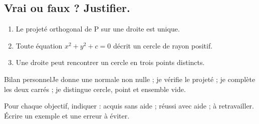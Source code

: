 \subsection*{Vrai ou faux ? Justifier.}\label{C07-VF}
\begin{enumerate}
\item Le projeté orthogonal de P sur une droite est unique.
\item Toute équation $x^2+y^2+c=0$ décrit un cercle de rayon positif.
\item Une droite peut rencontrer un cercle en trois points distincts.
\end{enumerate}
\begin{repere}{Bilan personnel}Je donne une normale non nulle ; je vérifie le projeté ; je complète les deux carrés ; je distingue cercle, point et ensemble vide.

Pour chaque objectif, indiquer : acquis sans aide ; réussi avec aide ; à retravailler. Écrire un exemple et une erreur à éviter.\end{repere}
\endgroup
\ifprof\fi
